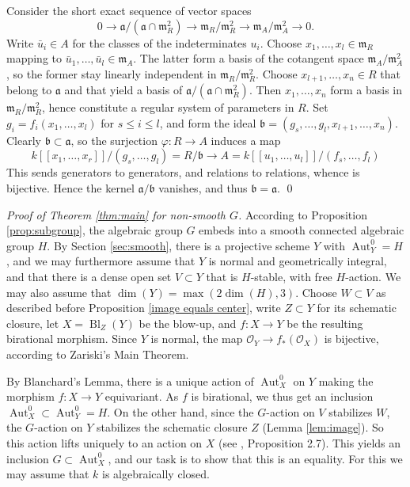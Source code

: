 \documentclass[oneside, 12pt]{amsart}
\theoremstyle{definition}
\theoremstyle{remark}
\newcommand{\ideala}{\mathfrak{a}}
\newcommand{\idealb}{\mathfrak{b}}
\newcommand{\Aut}{\operatorname{Aut}}
\newcommand{\Bl}{\operatorname{Bl}}
\newcommand{\lra}{\longrightarrow}
\newcommand{\maxid}{\mathfrak{m}}
\renewcommand{\O}{\mathscr{O}}
\newcommand{\ra}{\rightarrow}
\begin{document}
\proof
Consider the short exact sequence of vector spaces
$$
0\lra \ideala/(\ideala\cap \maxid_R^2)\lra \maxid_R/\maxid_R^2\lra \maxid_A/\maxid_A^2\lra 0.
$$
Write $\bar{u}_i\in A$ for the classes of the indeterminates $u_i$.
Choose $x_1,\ldots,x_l\in \maxid_R$ mapping to   $\bar{u}_1,\ldots,\bar{u}_l\in\maxid_A$.
 The latter form a basis of the cotangent space $\maxid_A/\maxid_A^2$,
so the former stay linearly independent in $\maxid_R/\maxid_R^2$.
Choose $x_{l+1},\ldots,x_n\in R$ that belong to $\ideala$ 
and that yield a basis of $\ideala/(\ideala\cap \maxid_R^2)$.
Then $x_1,\ldots,x_n$ form a basis in $\maxid_R/\maxid_R^2$, hence constitute 
a regular system of parameters in $R$.
Set $g_i=f_i(x_1,\ldots,x_l)$ for $s\leq i\leq l$, and  form the ideal $\idealb=(g_s,\ldots,g_l,x_{l+1},\ldots,x_n)$.
Clearly $\idealb\subset \ideala$, so the surjection $\varphi:R\ra A$ induces a map
$$
k[[x_1,\ldots,x_r]]/(g_s,\ldots,g_l)=R/\idealb\lra A= k[[u_1,\ldots,u_l]]/(f_s,\ldots,f_l)
$$
This  sends generators to generators, and relations to relations, whence is bijective.
Hence the kernel $\ideala/\idealb$ vanishes, and thus  $\idealb=\ideala$.
\qed

\medskip

\emph{Proof of Theorem \ref{thm:main} for non-smooth $G$.}
According to Proposition \ref{prop:subgroup}, 
the algebraic group $G$ embeds into a smooth connected algebraic 
group $H$. By Section \ref{sec:smooth}, 
there is a projective scheme $Y$ with $\Aut^0_Y=H$,
and we may furthermore assume that $Y$ is normal and geometrically integral, 
and that there is a dense
open set $V\subset Y$ that is $H$-stable, with free $H$-action.  
We may also assume that $\dim(Y)= \max(2\dim(H),3)$.
Choose $W \subset V$ as described before Proposition \ref{image equals center},   
write $Z\subset Y$ for its schematic closure,
let $X=\Bl_Z(Y)$ be the blow-up, and   
$f:X\ra Y$ be the resulting birational morphism. 
Since $Y$ is normal, 
the map $\O_Y\ra f_*(\O_X)$ is bijective, according to Zariski's Main Theorem.

By Blanchard's Lemma, there is a unique action of $\Aut_X^0$ on $Y$ 
making the morphism $f:X\ra Y$ equivariant. 
As $f$ is birational, 
we thus get an inclusion $\Aut_X^0 \subset \Aut_Y^0 = H$.
On the other hand, since the $G$-action on $V$ stabilizes $W$, 
the $G$-action on $Y$ stabilizes the schematic closure $Z$
(Lemma \ref{lem:image}). So this action lifts uniquely
to an action on $X$ (see \cite{Martin 2022}, Proposition 2.7). 
This yields an inclusion $G \subset \Aut^0_X$, 
and our task is to show that this is an equality.
For this we may assume that $k$ is algebraically closed.
\end{document}
